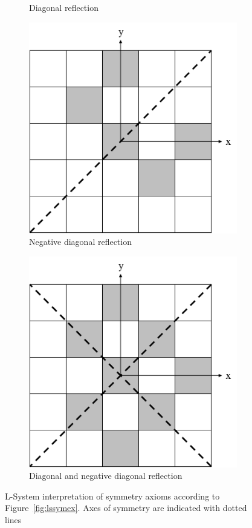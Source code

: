 \begin{figure}[H]
\begin{subfigure}[t]{0.3\textwidth}
		\caption{Diagonal reflection}
	\end{subfigure}
	\hfill
	\begin{subfigure}[t]{0.3\textwidth}
		\centering
		\includegraphics[width=\textwidth]{LSSymRefND.png}
		\caption{Negative diagonal reflection}
	\end{subfigure}
	\hfill
	\begin{subfigure}[t]{0.3\textwidth}
		\centering
		\includegraphics[width=\textwidth]{LSSymRefDND.png}
		\caption{Diagonal and negative diagonal reflection}
	\end{subfigure}
	\caption[L-System symmetry interpretations]{L-System interpretation of symmetry axioms according to Figure~\ref{fig:lssymex}. Axes of symmetry are indicated with dotted lines}
	\label{fig:lssym}
\end{figure}

